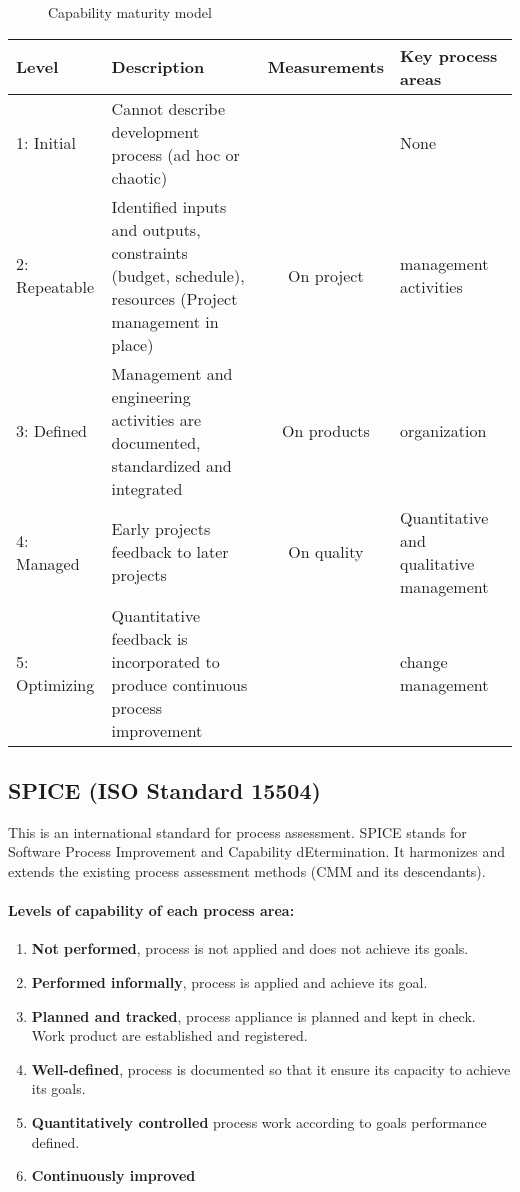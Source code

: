 \begin{figure}[!ht]
    \centering
    \begin{scriptsize}
        
    \end{scriptsize}
    \caption{Capability maturity model}
\end{figure}

\begin{tabular}{l|m{}cm{}}
    \bf Level & \bf Description & \bf Measurements & \bf Key process areas \\
    \hline
    1: Initial & Cannot describe development process (ad hoc or chaotic) && None \\
    2: Repeatable & Identified inputs and outputs, constraints (budget, schedule), resources
    (Project management in place) & On project & management activities\\
    3: Defined & Management and engineering activities are documented,
    standardized and integrated & On products & organization\\
    4: Managed & Early projects feedback to later projects & On quality
    & Quantitative and qualitative management \\
    5: Optimizing & Quantitative feedback is incorporated to produce
    continuous process improvement && change management\\
\end{tabular}

\subsection{SPICE (ISO Standard 15504)}

This is an international standard for process assessment. SPICE stands for
Software Process Improvement and Capability dEtermination. It harmonizes
and extends the existing process assessment methods (CMM and its
descendants).

\paragraph{Levels of capability of each process area:}
\begin{enumerate}
    \item \textbf{Not performed}, process is not applied
     and does not achieve its goals.
    \item \textbf{Performed informally}, process is applied and achieve its
    goal.
    \item \textbf{Planned and tracked}, process appliance is planned and
    kept in check. Work product are established and registered.
    \item \textbf{Well-defined}, process is documented so that it ensure its
    capacity to achieve its goals.
    \item \textbf{Quantitatively controlled} process work according to
    goals performance defined.
    \item \textbf{Continuously improved}
\end{enumerate}

